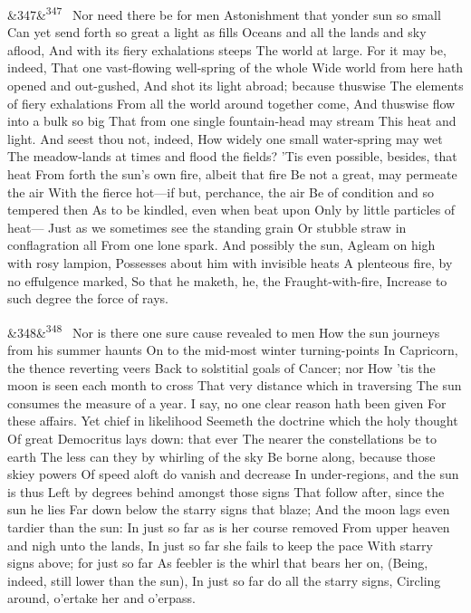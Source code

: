 \documentclass[12pt]{article}
\newcommand{\para}[1][]{\par\noindent\ifx&#1&\else\textsuperscript{\footnotesize #1}~\fi}
\begin{document}
\para[347] Nor need there be for men Astonishment that yonder sun so small Can yet send forth so great a light as fills Oceans and all the lands and sky aflood, And with its fiery exhalations steeps The world at large. For it may be, indeed, That one vast-flowing well-spring of the whole Wide world from here hath opened and out-gushed, And shot its light abroad; because thuswise The elements of fiery exhalations From all the world around together come, And thuswise flow into a bulk so big That from one single fountain-head may stream This heat and light. And seest thou not, indeed, How widely one small water-spring may wet The meadow-lands at times and flood the fields? 'Tis even possible, besides, that heat From forth the sun's own fire, albeit that fire Be not a great, may permeate the air With the fierce hot---if but, perchance, the air Be of condition and so tempered then As to be kindled, even when beat upon Only by little particles of heat--- Just as we sometimes see the standing grain Or stubble straw in conflagration all From one lone spark. And possibly the sun, Agleam on high with rosy lampion, Possesses about him with invisible heats A plenteous fire, by no effulgence marked, So that he maketh, he, the Fraught-with-fire, Increase to such degree the force of rays.

\para[348] Nor is there one sure cause revealed to men How the sun journeys from his summer haunts On to the mid-most winter turning-points In Capricorn, the thence reverting veers Back to solstitial goals of Cancer; nor How 'tis the moon is seen each month to cross That very distance which in traversing The sun consumes the measure of a year. I say, no one clear reason hath been given For these affairs. Yet chief in likelihood Seemeth the doctrine which the holy thought Of great Democritus lays down: that ever The nearer the constellations be to earth The less can they by whirling of the sky Be borne along, because those skiey powers Of speed aloft do vanish and decrease In under-regions, and the sun is thus Left by degrees behind amongst those signs That follow after, since the sun he lies Far down below the starry signs that blaze; And the moon lags even tardier than the sun: In just so far as is her course removed From upper heaven and nigh unto the lands, In just so far she fails to keep the pace With starry signs above; for just so far As feebler is the whirl that bears her on, (Being, indeed, still lower than the sun), In just so far do all the starry signs, Circling around, o'ertake her and o'erpass.
\end{document}
